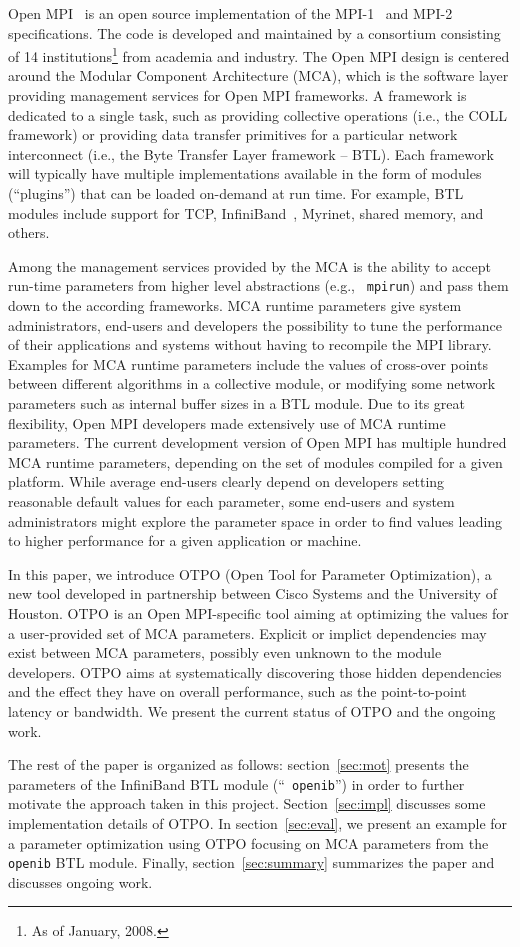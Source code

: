 Open MPI~\cite{gabriel:ompi} is an open source implementation of the
MPI-1~\cite{mpi1} and MPI-2~\cite{mpi2} specifications. The code is
developed and maintained by a consortium consisting of 14
institutions\footnote{As of January, 2008.} from academia and
industry. The Open MPI design is centered around the Modular Component
Architecture (MCA), which is the software layer providing management
services for Open MPI frameworks. A framework is dedicated to a single
task, such as providing collective operations (i.e., the COLL
framework) or providing data transfer primitives for a particular
network interconnect (i.e., the Byte Transfer Layer framework --
BTL). Each framework will typically have multiple implementations
available in the form of modules (``plugins'') that can be loaded
on-demand at run time.  For example, BTL modules include support for
TCP, InfiniBand~\cite{ib}, Myrinet, shared memory, and others.

Among the management services provided by the MCA is the ability to
accept run-time parameters from higher level abstractions (e.g., {\tt
  mpirun}) and pass them down to the according frameworks. MCA runtime
parameters give system administrators, end-users and developers the
possibility to tune the performance of their applications and systems
without having to recompile the MPI library. Examples for MCA runtime
parameters include the values of cross-over points between different
algorithms in a collective module, or modifying some network
parameters such as internal buffer sizes in a BTL module. Due to its
great flexibility, Open MPI developers made extensively use of MCA
runtime parameters.  The current development version of Open MPI has
multiple hundred MCA runtime parameters, depending on the set of
modules compiled for a given platform. While average end-users clearly
depend on developers setting reasonable default values for each
parameter, some end-users and system administrators might explore the
parameter space in order to find values leading to higher performance
for a given application or machine.

In this paper, we introduce OTPO (Open Tool for Parameter
Optimization), a new tool developed in partnership between Cisco
Systems and the University of Houston. OTPO is an Open MPI-specific
tool aiming at optimizing the values for a user-provided set of MCA
parameters.  Explicit or implict dependencies may exist between MCA
parameters, possibly even unknown to the module developers. OTPO aims
at systematically discovering those hidden dependencies and the effect
they have on overall performance, such as the point-to-point latency
or bandwidth. We present the current status of OTPO and the ongoing
work.

The rest of the paper is organized as follows: section~\ref{sec:mot}
presents the parameters of the InfiniBand BTL module (``{\tt
  openib}'') in order to further motivate the approach taken in this
project. Section~\ref{sec:impl} discusses some implementation details
of OTPO. In section~\ref{sec:eval}, we present an example for a
parameter optimization using OTPO focusing on MCA parameters from the
{\tt openib} BTL module. Finally, section~\ref{sec:summary} summarizes
the paper and discusses ongoing work.

